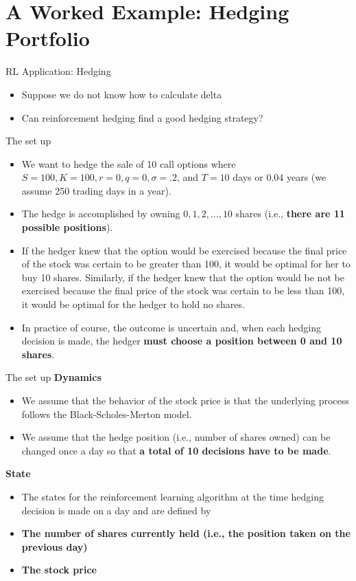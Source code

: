\documentclass[11pt]{beamer}
\begin{document}
\section{A Worked Example: Hedging Portfolio}
\begin{frame}{RL Application: Hedging}
	\begin{itemize}
		\item Suppose we do not know how to calculate delta
		\item Can reinforcement hedging find a good hedging strategy?
	\end{itemize}
\end{frame}
\begin{frame}{The set up }
	\begin{itemize}
		\item We want to hedge the sale of 10 call options where $S = 100, K = 100, r = 0, q = 0, \sigma= .2$, and $T = 10$ days or $0.04$ years (we assume 250 trading days in a year).
		\item The hedge is accomplished by owning $0, 1, 2,\dots, 10$ shares (i.e., \textbf{there are 11 possible positions}). 
		\item If the hedger knew that the option would be exercised because the final price of the stock was certain to be greater than 100, it would be optimal for her to buy 10 shares. Similarly, if the hedger knew that the option would be not be exercised because the final price of the stock was certain to be less than 100, it would be optimal for the hedger to hold no shares. 
		\item In practice of course, the outcome is uncertain and, when each hedging decision is made, the hedger \textbf{must choose a position between 0 and 10 shares}.
	\end{itemize}
\end{frame}
\begin{frame}{The set up }
\textbf{Dynamics}
	\begin{itemize}
		\item We assume that the behavior of the stock price is that the underlying process follows the Black-Scholes-Merton model.
		\item We assume that the hedge position (i.e., number of shares owned) can be changed once a day so that \textbf{a total of 10 decisions have to be made}.
\end{itemize}
\textbf{State}
\begin{itemize}
		\item The states for the reinforcement learning algorithm at the time hedging decision is made on a day and are defined by
		\item \textbf{The number of shares currently held (i.e., the position taken on the previous day)}
		\item \textbf{The stock price}
	\end{itemize}
\end{frame}
\end{document}
